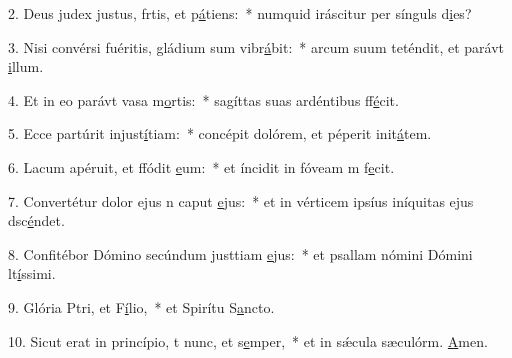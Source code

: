 2. Deus judex justus, frtis, et p\uline{á}tiens:~* numquid iráscitur per sínguls d\uline{i}es?\par 
3. Nisi convérsi fuéritis, gládium sum vibr\uline{á}bit:~* arcum suum teténdit, et parávt \uline{i}llum.\par 
4. Et in eo parávt vasa m\uline{o}rtis:~* sagíttas suas ardéntibus ff\uline{é}cit.\par 
5. Ecce partúrit injust\uline{í}tiam:~* concépit dolórem, et péperit init\uline{á}tem.\par 
6. Lacum apéruit, et ffódit \uline{e}um:~* et íncidit in fóveam m f\uline{e}cit.\par 
7. Convertétur dolor ejus n caput \uline{e}jus:~* et in vérticem ipsíus iníquitas ejus dsc\uline{é}ndet.\par 
8. Confitébor Dómino secúndum justtiam \uline{e}jus:~* et psallam nómini Dómini lt\uline{í}ssimi.\par 
9. Glória Ptri, et F\uline{í}lio,~* et Spirítu S\uline{a}ncto.\par 
10. Sicut erat in princípio, t nunc, et s\uline{e}mper,~* et in sǽcula sæculórm. \uline{A}men.\par 
